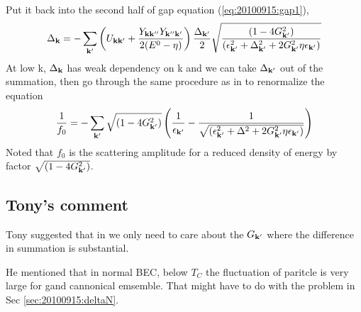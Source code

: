 Put it back into the second half of gap equation (\ref{eq:20100915:gap1}), 
\[
\Delta_{\mathbf{k}}=-\sum_{\mathbf{k}'}\left(U_{\mathbf{k}\mathbf{k}'}+\frac{Y_{\mathbf{k}\mathbf{k}''}Y_{\mathbf{k}''\mathbf{k}'}}{2(E^{0}-\eta)}\right)\frac{\Delta_{\mathbf{k}'}}2\sqrt{\frac{(1-4G_{\mathbf{k}'}^{2})}{(\epsilon_{\mathbf{k}'}^{2}+\Delta_{\mathbf{k}'}^{2}+2G_{\mathbf{k}'}^{2}\eta\epsilon_{\mathbf{k}'})}}
\]
At low k, $\Delta_{\mathbf{k}}$ has weak dependency on k and we can take $\Delta_{\mathbf{k}'}$ out of the summation,  then go through the same procedure as in \cite{Leggett,Fetter} to renormalize the equation
\begin{equation}\label{eq:20100915:renormGap}
\frac{1}{f_{0}}=-\sum_{\mathbf{k}'}\sqrt{(1-4G_{\mathbf{k}'}^{2})}
\left(\frac{1}{\epsilon_{\mathbf{k}'}}-\frac{1}{\sqrt{(\epsilon_{\mathbf{k}'}^{2}+\Delta^{2}+2G_{\mathbf{k}'}^{2}\eta\epsilon_{\mathbf{k}'})}}\right)
\end{equation}
Noted that $f_{0}$ is the scattering amplitude for a reduced density of energy by factor $\sqrt{(1-4G_{\mathbf{k}'}^{2})}$.  

\subsection{Tony's comment}
Tony suggested that in  we only need to care about the $G_{\mathbf{k}'}$ where the difference in summation is substantial.  

He mentioned that in normal BEC, below $T_{C}$ the fluctuation of paritcle is very large for gand cannonical emsemble.  That might have to do with the problem in Sec \ref{sec:20100915:deltaN}.